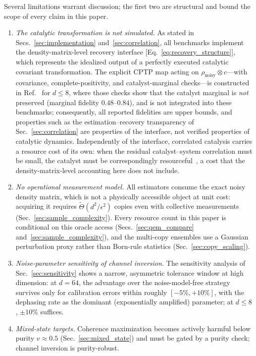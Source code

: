 \documentclass[pra,twocolumn,superscriptaddress,longbibliography,floatfix,nofootinbib]{revtex4-2}
\newcommand{\rhon}{\rho_\mathrm{noisy}}
\begin{document}
Several limitations warrant discussion; the first two are structural and bound the scope of every claim in this paper.
\begin{enumerate}
\item \emph{The catalytic transformation is not simulated.}
As stated in Secs.~\ref{sec:implementation} and~\ref{sec:correlation}, all benchmarks implement the density-matrix-level recovery interface [Eq.~\eqref{eq:recovery_structure}], which represents the idealized output of a perfectly executed catalytic covariant transformation.
The explicit CPTP map acting on $\rhon \otimes c$---with covariance, complete-positivity, and catalyst-marginal checks---is constructed in Ref.~\cite{Wakaura2026unified} for $d \leq 8$, where those checks show that the catalyst marginal is \emph{not} preserved (marginal fidelity $0.48$--$0.84$), and is not integrated into these benchmarks; consequently, all reported fidelities are upper bounds, and properties such as the estimation--recovery transparency of Sec.~\ref{sec:correlation} are properties of the interface, not verified properties of catalytic dynamics.
Independently of the interface, correlated catalysis carries a resource cost of its own: when the residual catalyst--system correlation must be small, the catalyst must be correspondingly resourceful~\cite{Rubboli2022limits}, a cost that the density-matrix-level accounting here does not include.
\item \emph{No operational measurement model.}
All estimators consume the exact noisy density matrix, which is not a physically accessible object at unit cost: acquiring it requires $\tilde\Theta(d^2/\epsilon^2)$ copies even with collective measurements (Sec.~\ref{sec:sample_complexity}).
Every resource count in this paper is conditional on this oracle access (Secs.~\ref{sec:qem_compare} and~\ref{sec:sample_complexity}), and the multi-copy ensembles use a Gaussian perturbation proxy rather than Born-rule statistics (Sec.~\ref{sec:copy_scaling}).
\item \emph{Noise-parameter sensitivity of channel inversion.}
The sensitivity analysis of Sec.~\ref{sec:sensitivity} shows a narrow, asymmetric tolerance window at high dimension: at $d = 64$, the advantage over the noise-model-free strategy survives only for calibration errors within roughly $[-5\%, +10\%]$, with the dephasing rate as the dominant (exponentially amplified) parameter; at $d \leq 8$, $\pm 10\%$ suffices.
\item \emph{Mixed-state targets.}
Coherence maximization becomes actively harmful below purity $v \approx 0.5$ (Sec.~\ref{sec:mixed_state}) and must be gated by a purity check; channel inversion is purity-robust.

\end{enumerate}
\end{document}
